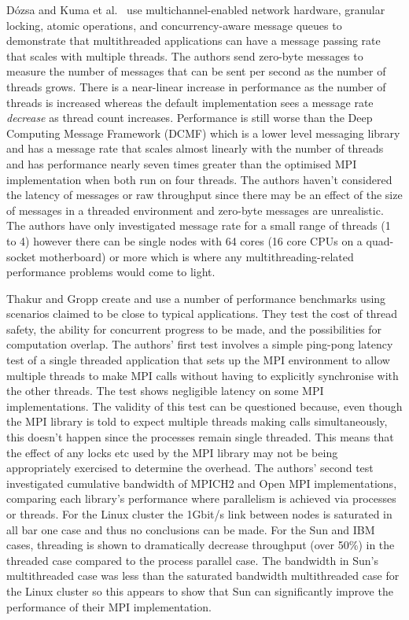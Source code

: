 \documentclass{acm_proc_article-sp}
\begin{document}
D\'{o}zsa and Kuma et al.\ \cite{Kumar} use multichannel-enabled network
hardware, granular locking, atomic operations, and concurrency-aware message
queues to demonstrate that multithreaded applications can have a message passing
rate that scales with multiple threads. The authors send zero-byte messages to
measure the number of messages that can be sent per second as the number of
threads grows. There is a near-linear increase in performance as the number of
threads is increased whereas the default implementation sees a message rate
\textit{decrease} as thread count increases. Performance is still worse than the
Deep Computing Message Framework (DCMF) which is a lower level messaging library
and has a message rate that scales almost linearly with the number of threads
and has performance nearly seven times greater than the optimised MPI
implementation when both run on four threads. The authors haven't considered the
latency of messages or raw throughput since there may be an effect of the size
of messages in a threaded environment and zero-byte messages are unrealistic.
The authors have only investigated message rate for a small range of threads (1
to 4) however there can be single nodes with 64 cores (16 core CPUs on a
quad-socket motherboard) or more which is where any multithreading-related
performance problems would come to light.

Thakur and Gropp \cite{Thakur2009} create and use a number of performance
benchmarks using scenarios claimed to be close to typical applications. They
test the cost of thread safety, the ability for concurrent progress to be made,
and the possibilities for computation overlap. The authors' first test involves
a simple ping-pong latency test of a single threaded application that sets up
the MPI environment to allow multiple threads to make MPI calls without having
to explicitly synchronise with the other threads. The test shows negligible
latency on some MPI implementations. The validity of this test can be questioned
because, even though the MPI library is told to expect multiple threads making
calls simultaneously, this doesn't happen since the processes remain single
threaded. This means that the effect of any locks etc used by the MPI library
may not be being appropriately exercised to determine the overhead. The authors'
second test investigated cumulative bandwidth of MPICH2 and Open MPI
implementations, comparing each library's performance where parallelism is
achieved via processes or threads. For the Linux cluster the 1Gbit/s link
between nodes is saturated in all bar one case and thus no conclusions can be
made. For the Sun and IBM cases, threading is shown to dramatically decrease
throughput (over 50\%) in the threaded case compared to the process parallel
case. The bandwidth in Sun's multithreaded case was less than the saturated
bandwidth multithreaded case for the Linux cluster so this appears to show that
Sun can significantly improve the performance of their MPI implementation.
\end{document}

